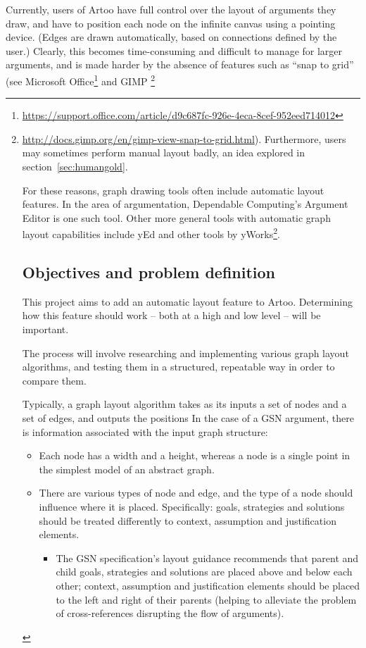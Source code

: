 Currently, users of Artoo have full control over the layout of arguments they draw, and have to position each node on the infinite canvas using a pointing device.
(Edges are drawn automatically, based on connections defined by the user.)
Clearly, this becomes time-consuming and difficult to manage for larger arguments, and is made harder by the absence of features such as ``snap to grid''
(see Microsoft Office\footnote{\url{https://support.office.com/article/d9c687fc-926e-4eca-8cef-952eed714012}}
and GIMP \footnote{\url{http://docs.gimp.org/en/gimp-view-snap-to-grid.html}).
Furthermore, users may sometimes perform manual layout badly, an idea explored in section~\ref{sec:humangold}.

For these reasons, graph drawing tools often include automatic layout features.
In the area of argumentation, Dependable Computing's Argument Editor is one such tool. 
Other more general tools with automatic graph layout capabilities include yEd and other tools by yWorks\footnote{\url{http://www.yworks.com/}}.


\section{Objectives and problem definition}

This project aims to add an automatic layout feature to Artoo.
Determining how this feature should work -- both at a high and low level -- will be important.

The process will involve researching and implementing various graph layout algorithms,
and testing them in a structured, repeatable way in order to compare them. 

Typically, a graph layout algorithm takes as its inputs a set of nodes and a set of edges, and outputs the positions 
In the case of a GSN argument, there is information associated with the input graph structure:

\begin{itemize}
  \item
    Each node has a width and a height, whereas a node is a single point in the simplest model of an abstract graph.
  \item
    There are various types of node and edge, and the type of a node should influence where it is placed. Specifically: goals, strategies and solutions should be treated differently to context, assumption and justification elements.
    \begin{itemize}
    \item The GSN specification's layout guidance \citep[section~2.2, pp.~26--27]{gsnstandard} recommends that parent and child goals, strategies and solutions are placed above and below each other; context, assumption and justification elements should be placed to the left and right of their parents (helping to alleviate the problem of cross-references disrupting the flow of arguments).
    \end{itemize}
\end{itemize}

}
